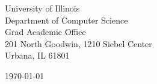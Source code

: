 \begin{minipage}{0.49\textwidth}
\begin{flushleft}
\noindent
University of Illinois\\
Department of Computer Science\\
Grad Academic Office\\
201 North Goodwin, 1210 Siebel Center\\
Urbana, IL 61801
\end{flushleft}
\end{minipage}
\begin{minipage}{0.47\textwidth}
\begin{flushright}
\today
\end{flushright}
\end{minipage} \\

\newcommand{\univ}{University of Illinois Urbana-Champaign}
\newcommand{\univshort}{UIUC}
\newcommand{\degree}{Ph.D.}
\newcommand{\dept}{Computer Science}
